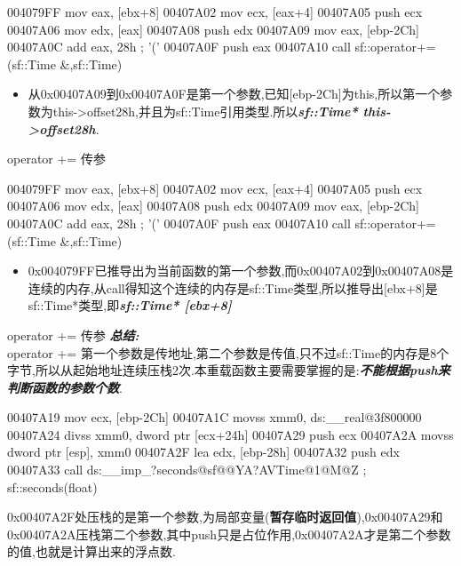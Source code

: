 \documentclass[AutoFakeBold,AutoFakeSlant]{beamer}
\begin{document}
	\begin{frame}[fragile]
		\begin{x86asmcode}
004079FF  mov   eax, [ebx+8]
00407A02  mov   ecx, [eax+4]
00407A05  push  ecx
00407A06  mov   edx, [eax]
00407A08  push  edx
00407A09  mov   eax, [ebp-2Ch]
00407A0C  add   eax, 28h ; '('
00407A0F  push  eax
00407A10  call  sf::operator+=(sf::Time &,sf::Time)\end{x86asmcode}
		\begin{itemize}
		\item 从0x00407A09到0x00407A0F是第一个参数,已知[ebp-2Ch]为this,所以第一个参数为this->offset28h,并且为sf::Time引用类型.所以\textbf{\textit{sf::Time* this->offset28h}}.
	\end{itemize}
	\end{frame}
	
	\begin{frame}[fragile]{operator += 传参}
		\begin{x86asmcode}
004079FF  mov   eax, [ebx+8]
00407A02  mov   ecx, [eax+4]
00407A05  push  ecx
00407A06  mov   edx, [eax]
00407A08  push  edx
00407A09  mov   eax, [ebp-2Ch]
00407A0C  add   eax, 28h ; '('
00407A0F  push  eax
00407A10  call  sf::operator+=(sf::Time &,sf::Time)\end{x86asmcode}
		\begin{itemize}
			\item 0x004079FF已推导出为当前函数的第一个参数,而0x00407A02到0x00407A08是连续的内存,从call得知这个连续的内存是sf::Time类型,所以推导出[ebx+8]是sf::Time*类型,即\textit{\textbf{sf::Time* [ebx+8]}}
		\end{itemize}
	\end{frame}
	
	\begin{frame}[fragile]{operator += 传参}
		\textit{\textbf{总结:}} \\
		operator += 第一个参数是传地址,第二个参数是传值,只不过sf::Time的内存是8个字节,所以从起始地址连续压栈2次.本重载函数主要需要掌握的是:\textit{\textbf{不能根据push来判断函数的参数个数}}.
	\end{frame}
	
	\begin{frame}[fragile]
		\begin{x86asmcode}
00407A19 mov    ecx, [ebp-2Ch]
00407A1C movss  xmm0, ds:__real@3f800000
00407A24 divss  xmm0, dword ptr [ecx+24h]
00407A29 push   ecx
00407A2A movss  dword ptr [esp], xmm0
00407A2F lea    edx, [ebp-28h]
00407A32 push   edx
00407A33 call   ds:__imp_?seconds@sf@@YA?AVTime@1@M@Z ; sf::seconds(float) \end{x86asmcode}
		0x00407A2F处压栈的是第一个参数,为局部变量(\textbf{暂存临时返回值}),0x00407A29和0x00407A2A压栈第二个参数,其中push只是占位作用,0x00407A2A才是第二个参数的值,也就是计算出来的浮点数.
	\end{frame}
	
\end{document}
